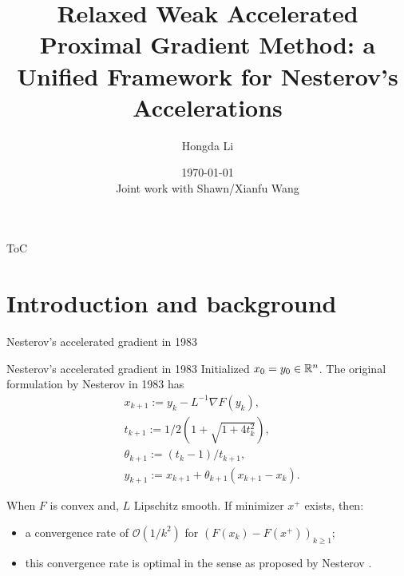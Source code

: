 \documentclass[11pt]{beamer}
\author[Hongda Li]{Hongda Li}
\title{
    Relaxed Weak Accelerated Proximal Gradient Method: a Unified Framework for Nesterov's Accelerations
}
\institute[UBCO]{
    University of British Columbia Okanagan
}
\date[\today]{\today \\ \vspace{1cm} \tiny{Joint work with Shawn/Xianfu Wang}}
\theoremstyle{definition}
\begin{document}
\begin{frame}
    \titlepage
\end{frame}

\begin{frame}{ToC}
    \tableofcontents
\end{frame}

\section{Introduction and background}
    \begin{frame}{Nesterov's accelerated gradient in 1983}
        \begin{block}{Nesterov's accelerated gradient in 1983}
            Initialized $x_0 = y_0 \in \mathbb R^n$. 
            The original formulation by Nesterov in 1983 \cite{nesterov_method_1983} has
            {\small
            \begin{align*}
                & x_{k + 1} := y_k - L^{-1}\nabla F(y_k),
                \\
                & t_{k + 1} := 1/2\left(1 + \sqrt{1 + 4t_{k}^2}\right),
                \\
                & \theta_{k + 1} := (t_{k} - 1)/t_{k + 1}, \label{eqn:example-algorithm}
                \\
                & y_{k + 1} := x_{k + 1} + \theta_{k + 1}(x_{k + 1} - x_k).
            \end{align*}    
            }
        \end{block}
        When $F$ is convex and, $L$ Lipschitz smooth. 
        If minimizer $x^+$ exists, then: 
        \begin{itemize}
            \item a convergence rate of $\mathcal O(1/k^2)$ for $(F(x_k) - F(x^+))_{k \ge 1}$;
            \item this convergence rate is optimal in the sense as proposed by Nesterov \cite{nesterov_lectures_2018}.
        \end{itemize}
    \end{frame}
\end{document}
